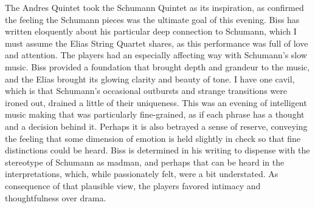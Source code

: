 The Andres Quintet took the Schumann Quintet as its inspiration, as confirmed the feeling the Schumann pieces was the ultimate goal of this evening. Biss has written eloquently about his particular deep connection to Schumann, which I must assume the Elias String Quartet shares, as this performance was full of love and attention. The players had an especially affecting way with Schumann’s slow music. Biss provided a foundation that brought depth and grandeur to the music, and the Elias brought its glowing clarity and beauty of tone. I have one cavil, which is that Schumann’s occasional outbursts and strange transitions were ironed out, drained a little of their uniqueness. This was an evening of intelligent music making that was particularly fine-grained, as if each phrase has a thought and a decision behind it. Perhaps it is also betrayed a sense of reserve, conveying the feeling that some dimension of emotion is held slightly in check so that fine distinctions could be heard. Biss is determined in his writing to dispense with the stereotype of Schumann as madman, and perhaps that can be heard in the interpretations, which, while passionately felt, were a bit understated. As consequence of that plausible view, the players favored intimacy and thoughtfulness over drama.

